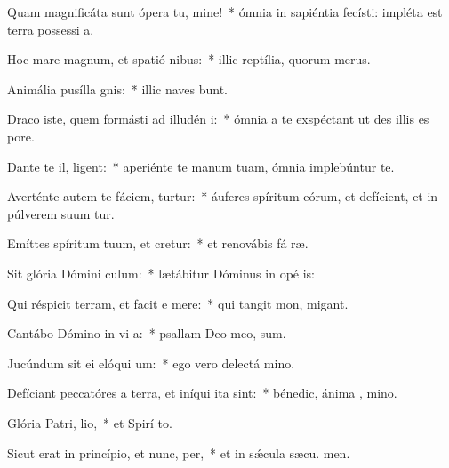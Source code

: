 \item Quam magnificáta sunt ópera tu, mine!~* ómnia in sapiéntia fecísti: impléta est terra possessi a.
\item Hoc mare magnum, et spatió nibus:~* illic reptília, quorum   merus.
\item Animália pusílla  gnis:~* illic naves bunt.
\item Draco iste, quem formásti ad illudén i:~* ómnia a te exspéctant ut des illis es  pore.
\item Dante te il, ligent:~* aperiénte te manum tuam, ómnia implebúntur te.
\item Averténte autem te fáciem, turtur:~* áuferes spíritum eórum, et defícient, et in púlverem suum tur.
\item Emíttes spíritum tuum, et cretur:~* et renovábis fá ræ.
\item Sit glória Dómini  culum:~* lætábitur Dóminus in opé is:
\item Qui réspicit terram, et facit e mere:~* qui tangit mon,  migant.
\item Cantábo Dómino in vi a:~* psallam Deo meo,  sum.
\item Jucúndum sit ei elóqui um:~* ego vero delectá  mino.
\item Defíciant peccatóres a terra, et iníqui ita   sint:~* bénedic, ánima , mino.
\item Glória Patri,  lio,~* et Spirí to.
\item Sicut erat in princípio, et nunc,  per,~* et in sǽcula sæcu. men.
